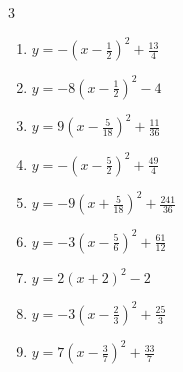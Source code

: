 \begin{multicols}{3}
\begin{enumerate}

  \item $\displaystyle y=-\left( x-\frac{1}{2}\right)^{2}+\frac{13}{4}$


  \item $\displaystyle y=-8\left( x-\frac{1}{2}\right)^{2}-4$


  \item $\displaystyle y=9\left( x-\frac{5}{18}\right)^{2}+\frac{11}{36}$


  \item $\displaystyle y=-\left( x-\frac{5}{2}\right)^{2}+\frac{49}{4}$


  \item $\displaystyle y=-9\left( x+\frac{5}{18}\right)^{2}+\frac{241}{36}$


\columnbreak %

\resetques

  \item $\displaystyle y=-3\left( x-\frac{5}{6}\right)^{2}+\frac{61}{12}$


  \item $\displaystyle y=2\left( x+2\right)^{2}-2$

        \phantom{$\displaystyle 頂点\left( -2 , -2 \right)$}

  \item $\displaystyle y=-3\left( x-\frac{2}{3}\right)^{2}+\frac{25}{3}$


  \item $\displaystyle y=7\left( x-\frac{3}{7}\right)^{2}+\frac{33}{7}$



\end{enumerate}
\end{multicols}
